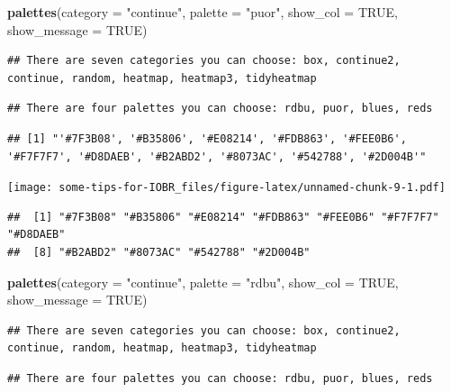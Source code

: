 \documentclass[
  12pt,
]{book}
\newenvironment{Shaded}{\begin{snugshade}}{\end{snugshade}}
\newcommand{\AttributeTok}[1]{\textcolor[rgb]{0.13,0.29,0.53}{#1}}
\newcommand{\ConstantTok}[1]{\textcolor[rgb]{0.56,0.35,0.01}{#1}}
\newcommand{\FunctionTok}[1]{\textcolor[rgb]{0.13,0.29,0.53}{\textbf{#1}}}
\newcommand{\NormalTok}[1]{#1}
\newcommand{\StringTok}[1]{\textcolor[rgb]{0.31,0.60,0.02}{#1}}
\begin{document}
\begin{Shaded}
\begin{Highlighting}[]
\FunctionTok{palettes}\NormalTok{(}\AttributeTok{category =} \StringTok{"continue"}\NormalTok{, }\AttributeTok{palette =} \StringTok{"puor"}\NormalTok{, }\AttributeTok{show\_col =} \ConstantTok{TRUE}\NormalTok{, }\AttributeTok{show\_message =} \ConstantTok{TRUE}\NormalTok{)}
\end{Highlighting}
\end{Shaded}

\begin{verbatim}
## There are seven categories you can choose: box, continue2, continue, random, heatmap, heatmap3, tidyheatmap
\end{verbatim}

\begin{verbatim}
## There are four palettes you can choose: rdbu, puor, blues, reds
\end{verbatim}

\begin{verbatim}
## [1] "'#7F3B08', '#B35806', '#E08214', '#FDB863', '#FEE0B6', '#F7F7F7', '#D8DAEB', '#B2ABD2', '#8073AC', '#542788', '#2D004B'"
\end{verbatim}

\texttt{[image: some-tips-for-IOBR\_files/figure-latex/unnamed-chunk-9-1.pdf]}

\begin{verbatim}
##  [1] "#7F3B08" "#B35806" "#E08214" "#FDB863" "#FEE0B6" "#F7F7F7" "#D8DAEB"
##  [8] "#B2ABD2" "#8073AC" "#542788" "#2D004B"
\end{verbatim}

\begin{Shaded}
\begin{Highlighting}[]
\FunctionTok{palettes}\NormalTok{(}\AttributeTok{category =} \StringTok{"continue"}\NormalTok{, }\AttributeTok{palette =} \StringTok{"rdbu"}\NormalTok{, }\AttributeTok{show\_col =} \ConstantTok{TRUE}\NormalTok{, }\AttributeTok{show\_message =} \ConstantTok{TRUE}\NormalTok{)}
\end{Highlighting}
\end{Shaded}

\begin{verbatim}
## There are seven categories you can choose: box, continue2, continue, random, heatmap, heatmap3, tidyheatmap
\end{verbatim}

\begin{verbatim}
## There are four palettes you can choose: rdbu, puor, blues, reds
\end{verbatim}
\end{document}
